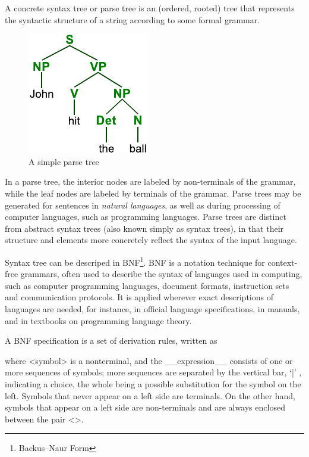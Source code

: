 A concrete syntax tree\cite{cst} or parse tree is an (ordered, rooted) tree that \mbox{represents} the syntactic structure of a string according to some formal grammar.
\begin{figure}
\begin{center}
\includegraphics{../ParseTree}
\caption{A simple parse tree}
\end{center}
\end{figure}
In a parse tree, the interior nodes are labeled by non-terminals of the grammar, while the leaf nodes are labeled by terminals of the grammar. Parse trees may be generated for sentences in {\em \mbox{natural} \mbox{languages}},  as well as during processing of computer languages, such as programming languages. Parse trees are \mbox{distinct} from abstract syntax trees (also known \mbox{simply} as syntax trees), in that their structure and \mbox{elements} more concretely reflect the syntax of the \mbox{input} language.

Syntax tree  can be descriped in BNF\footnote{Backus–Naur Form}.
BNF\cite{BNF} is a notation technique for context-free grammars, often used to describe the syntax of languages used in computing, such as computer programming languages, document formats, instruction sets and communication protocols. It is applied wherever exact descriptions of languages are needed, for instance, in official language specifications, in manuals, and in textbooks on programming language theory.

A BNF specification is a set of derivation rules, written as

where <symbol> is a nonterminal, and the \_\_expression\_\_ consists of one or more sequences of symbols; more sequences are separated by the vertical bar, `|' , indicating a choice, the whole being a possible substitution for the symbol on the left. Symbols that never appear on a left side are terminals. On the other hand, symbols that appear on a left side are non-terminals and are always enclosed between the pair <>.

